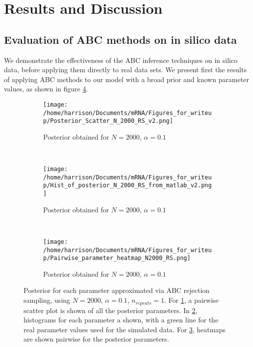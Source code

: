 \documentclass[twocolumn]{biophys}
\begin{document}
\section{Results and Discussion} \label{Results}
\subsection{Evaluation of ABC methods on in silico data}
We demonstrate the effectiveness of the ABC inference techniques on in silico data, before applying them directly to real data sets. 
We present first the results of applying ABC methods to our model with a broad prior and known parameter values, as shown in figure \ref{FIG:ABC_Posterior}.
\begin{figure} 
        \centering
        \begin{subfigure}[h]{0.95\columnwidth}
                \texttt{[image: /home/harrison/Documents/mRNA/Figures\_for\_writeup/Posterior\_Scatter\_N\_2000\_RS\_v2.png]}
                \caption{Posterior obtained for $N=2000$, $\alpha=0.1$}
                \label{fig:a}
        \end{subfigure}%
        
        
        ~ %
        \begin{subfigure}[h]{0.95\columnwidth}
                \texttt{[image: /home/harrison/Documents/mRNA/Figures\_for\_writeup/Hist\_of\_posterior\_N\_2000\_RS\_from\_matlab\_v2.png]}
                \caption{Posterior obtained for $N=2000$, $\alpha=0.1$}
                \label{fig:b}
        \end{subfigure}
        
         ~ %
        \begin{subfigure}[h]{0.95\columnwidth}
                \texttt{[image: /home/harrison/Documents/mRNA/Figures\_for\_writeup/Pairwise\_parameter\_heatmap\_N2000\_RS.png]}
                \caption{Posterior obtained for $N=2000$, $\alpha=0.1$}
                \label{fig:c}
        \end{subfigure}
        
        \caption{Posterior for each parameter approximated via ABC rejection sampling, using $N=2000$, $\alpha=0.1$, $n_{repeats}=1$. For \ref{fig:a}, a pairwise scatter plot is shown of all the posterior parameters. In \ref{fig:b}, histograms for each parameter a shown, with a green line for the real parameter values used for the simulated data. For \ref{fig:c}, heatmaps are shown pairwise for the posterior parameters.}
        \label{FIG:ABC_Posterior}
\end{figure}
\end{document}
